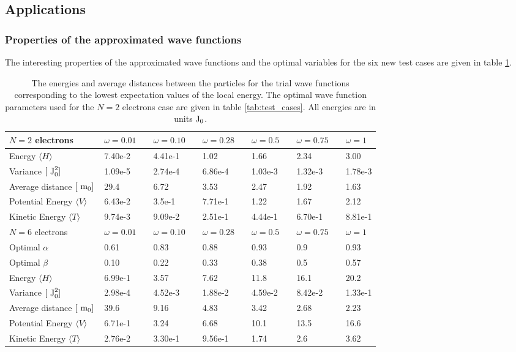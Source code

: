 \subsection{Applications}

\subsubsection{Properties of the approximated wave functions} \label{sec:res_properties}

The interesting properties of the approximated wave functions and the optimal variables for the six new test cases are given in table \ref{tab:interesting_quantitities}. 

\begin{table}[h!]
	\centering 
	\begin{tabular}{l@{ } l@{ } l@{ } l@{ } l@{ } l@{ } l}
		\toprule
		$N=2$ electrons & $\omega = 0.01 \quad $ &  $\omega = 0.10 \quad $ & $\omega =0.28 \quad $  & $\omega = 0.5 \quad $ & $\omega = 0.75 \quad $ & $\omega = 1$ \\
		\midrule
		Energy $\langle H \rangle$  & 	7.40e-2 & 4.41e-1 & 1.02  & 1.66 & 2.34 & 3.00\\
		\shaderow Variance $[~\textrm{J}_0^2]$  &	1.09e-5 & 2.74e-4 & 6.86e-4 & 1.03e-3  & 1.32e-3 & 1.78e-3 \\
		Average distance $[~\textrm{m}_0]$& 	29.4 & 6.72 & 3.53 & 2.47 & 1.92 & 1.63 \\
		\shaderow Potential Energy $\langle V \rangle \quad $  & 6.43e-2 & 3.5e-1 & 7.71e-1 & 1.22 & 1.67 & 2.12 \\ 
		Kinetic Energy $\langle T \rangle$  &  9.74e-3 & 9.09e-2 & 2.51e-1  & 4.44e-1 & 6.70e-1 & 8.81e-1 \\
		\bottomrule
		\toprule
		$N=6$ electrons & $\omega = 0.01$ &  $\omega = 0.10$ & $\omega =0.28$ & $\omega = 0.5$ & $\omega = 0.75$ & $\omega = 1$ \\
		\midrule
		Optimal $\alpha$ & 0.61 & 0.83 & 0.88 & 0.93 & 0.9 & 0.93 \\
		\shaderow Optimal $\beta$  & 0.10 & 0.22 & 0.33 & 0.38 & 0.5 & 0.57 \\
		Energy $\langle H \rangle$   & 6.99e-1 & 3.57 & 7.62 &  11.8 & 16.1 & 20.2 \\
		\shaderow Variance $[~\textrm{J}_0^2]$  & 2.98e-4 & 4.52e-3 & 1.88e-2  & 4.59e-2 & 8.42e-2 & 1.33e-1 \\
		Average distance $[~\textrm{m}_0]$& 39.6 &	9.16 & 4.83 & 3.42 & 2.68 & 2.23 \\
		\shaderow Potential Energy $\langle V \rangle $ & 6.71e-1 &  3.24 & 6.68 & 10.1 & 13.5 & 16.6 \\ 
		Kinetic Energy $\langle T \rangle$ & 2.76e-2 &  3.30e-1 & 9.56e-1 & 1.74 & 2.6 & 3.62 \\
		\bottomrule
	\end{tabular}
	\caption{The energies and average distances between the particles for the trial wave functions 
			corresponding to the lowest expectation values of the local energy.
			The optimal wave function parameters used for the $N=2$ electrons case are given in table \ref{tab:test_cases}.
			All energies are in units$~\textrm{J}_0$.}
	\label{tab:interesting_quantitities}
\end{table}

